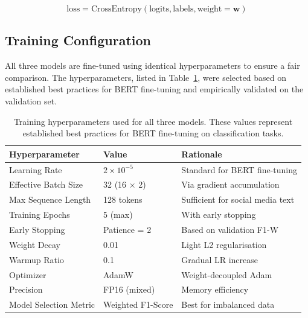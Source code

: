 \documentclass[12pt, a4paper]{article}
\begin{document}
\begin{equation}
\text{loss} = \text{CrossEntropy}(\text{logits}, \text{labels}, \text{weight}=\mathbf{w})
\label{eq:implementation}
\end{equation}

\subsection{Training Configuration}

All three models are fine-tuned using identical hyperparameters to ensure a fair comparison. The hyperparameters, listed in Table~\ref{tab:hyperparams}, were selected based on established best practices for BERT fine-tuning \citep{devlin2019bert} and empirically validated on the validation set.

\begin{table}[!htbp]
\centering
\caption{Training hyperparameters used for all three models. These values represent established best practices for BERT fine-tuning on classification tasks.}
\label{tab:hyperparams}
\begin{tabular}{l l l}
\toprule
\textbf{Hyperparameter} & \textbf{Value} & \textbf{Rationale} \\
\midrule
Learning Rate          & $2 \times 10^{-5}$  & Standard for BERT fine-tuning \\
Effective Batch Size   & 32 (16 $\times$ 2)  & Via gradient accumulation \\
Max Sequence Length    & 128 tokens           & Sufficient for social media text \\
Training Epochs        & 5 (max)             & With early stopping \\
Early Stopping         & Patience = 2        & Based on validation F1-W \\
Weight Decay           & 0.01                & Light L2 regularisation \\
Warmup Ratio           & 0.1                 & Gradual LR increase \\
Optimizer              & AdamW               & Weight-decoupled Adam \\
Precision              & FP16 (mixed)        & Memory efficiency \\
Model Selection Metric & Weighted F1-Score   & Best for imbalanced data \\
\bottomrule
\end{tabular}
\end{table}

\vspace{1em}
\end{document}
